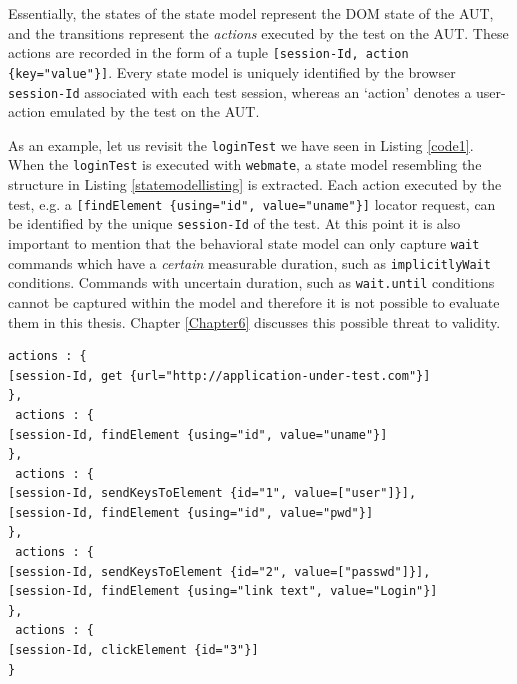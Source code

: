 Essentially, the states of the state model represent the DOM state of the AUT, and the transitions represent the \textit{actions} executed by the test on the AUT. These actions are recorded in the form of a tuple \texttt{[session-Id, action \{key="value"\}]}. Every state model is uniquely identified by the browser \texttt{session-Id} associated with each test session, whereas an `action' denotes a user-action emulated by the test on the AUT.  

As an example, let us revisit the \texttt{loginTest} we have seen in Listing \ref{code1}. When the \texttt{loginTest} is executed with \texttt{webmate}, a state model resembling the structure in Listing \ref{statemodellisting} is extracted. Each action executed by the test, e.g. a \texttt{[findElement \{using="id", value="uname"\}]} locator request, can be identified by the unique \texttt{session-Id} of the test. 
At this point it is also important to mention that the behavioral state model can only capture \texttt{wait} commands which have a \textit{certain} measurable duration, such as \texttt{implicitlyWait} conditions. Commands with uncertain duration, such as \texttt{wait.until} conditions cannot be captured within the model and therefore it is not possible to evaluate them in this thesis. Chapter \ref{Chapter6} discusses this possible threat to validity. 

\begin{center}
\begin{scriptsize}
\centering
\lstset{
  basicstyle=\ttfamily,
  columns=fullflexible,
  keepspaces=true,
}
  
\begin{lstlisting}[caption=Extracted behavioral state model for \texttt{loginTest},label=statemodellisting]
 actions : { 
[session-Id, get {url="http://application-under-test.com"}]
},
 actions : { 
[session-Id, findElement {using="id", value="uname"}]
},
 actions : { 
[session-Id, sendKeysToElement {id="1", value=["user"]}],
[session-Id, findElement {using="id", value="pwd"}]
},
 actions : { 
[session-Id, sendKeysToElement {id="2", value=["passwd"]}],
[session-Id, findElement {using="link text", value="Login"}]
},
 actions : { 
[session-Id, clickElement {id="3"}]
}
\end{lstlisting}
\end{scriptsize} 
\end{center}

